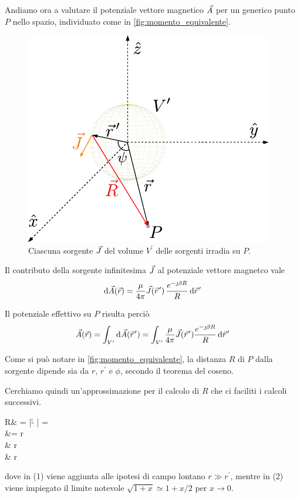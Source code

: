 Andiamo ora a valutare il potenziale vettore magnetico $\vec{A}$ per un generico punto $P$ nello spazio, individuato come in \autoref{fig:momento_equivalente}.

\begin{figure}[htp]
	\centering
	\includegraphics[]{img/momento_equivalente.pdf}
	\caption{Ciascuna sorgente $\vec{J}$ del volume $V^\prime$ delle sorgenti irradia su $P$.}
	\label{fig:momento_equivalente}
\end{figure}

Il contributo della sorgente infinitesima $\vec{J}$ al potenziale vettore magnetco vale
\begin{equation}
	\de \A(\r)
	= \frac{\mu}{4\pi} \J(\rp) \, \frac{e^{-\jmath \beta R}}{R} \de \rp
\end{equation}

Il potenziale effettivo su $P$ risulta perciò
\begin{equation} \label{eq:A_di_P}
	\A(\r)=\int_{V^\prime} \de \A(\rp) =\int_{V^\prime} \frac{\mu}{4\pi} \J(\rp) \frac{e^{-\jmath \beta R}}{R} \de \rp
\end{equation}

Come si può notare in \autoref{fig:momento_equivalente}, la distanza $R$ di $P$ dalla sorgente dipende sia da $r$, $r^\prime$ e $\phi$, secondo il teorema del coseno.

Cerchiamo quindi un'approssimazione per il calcolo di $R$ che ci faciliti i calcoli successivi.

\begin{esp} \label{eq:approssimazione_per_R}
	R&
	= |\r - \rp|
	=  \\
	&= r \,  \\
	& r \,  \\
	& r 
\end{esp}
dove in (1) viene aggiunta alle ipotesi di campo lontano $r \gg r^\prime$, mentre in (2) viene impiegato il limite notevole $\sqrt{1 + x} \simeq 1 + x/2$ per $x \to 0$.

